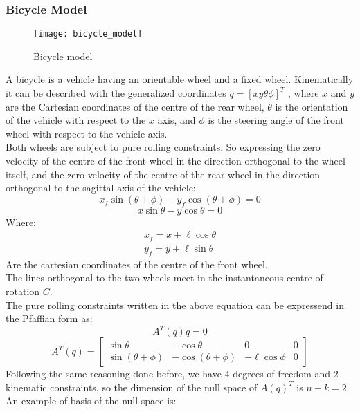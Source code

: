 \subsubsection{Bicycle Model}
\begin{figure}[h!]
	\centering
	\texttt{[image: bicycle\_model]}
	\caption{Bicycle model}
\end{figure}
A bicycle is a vehicle having an orientable wheel and a fixed wheel. Kinematically it can be described with the generalized coordinates $q = [x y \theta \phi]^T$ , where $x$ and $y$ are the Cartesian coordinates of the centre of the rear wheel, $\theta$ is the orientation of the vehicle with respect to the $x$ axis, and $\phi$ is the steering angle of the front wheel with respect to the vehicle axis.\\
Both wheels are subject to pure rolling constraints. So expressing the zero velocity of the centre of the front wheel in the direction orthogonal to the wheel itself, and the zero velocity of the centre of the rear wheel in the direction orthogonal to the sagittal axis of the vehicle:
\begin{equation}
\dot{x}_f\sin \left( \theta+\phi \right)-\dot{y}_f \cos\left(\theta+\phi\right)=0
\end{equation}
\begin{equation}
\dot{x}\sin\theta-\dot{y}\cos\theta=0
\end{equation}
Where:
\begin{align*}
x_f=x+\ell\cos\theta \\
y_f=y+\ell\sin\theta
\end{align*}
Are the cartesian coordinates of the centre of the front wheel.\\
The lines orthogonal to the two wheels meet in the instantaneous centre of rotation $C$.\\
The pure rolling constraints written in the above equation can be expressend in the Pfaffian form as:
\begin{equation*} 
A^T \left( q \right)\dot{q} =0  
\end{equation*}
\begin{equation}
A^T \left( q \right) = \left[ 
\begin{matrix}
\sin\theta & -\cos\theta & 0 & 0 \\
\sin\left(\theta+\phi \right) & -\cos\left(\theta+\phi \right) & -\ell\cos\phi & 0
\end{matrix}
\right]
\end{equation}
Following the same reasoning done before, we have 4 degrees of freedom and 2 kinematic constraints, so the dimension of the null space of $A(q)^T$ is $n-k= 2$. An example of basis of the null space is:
